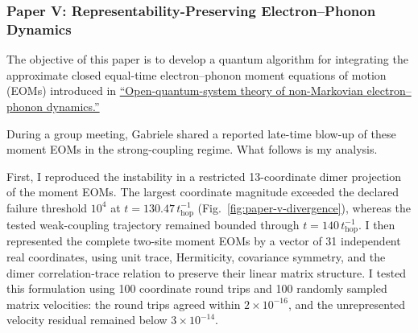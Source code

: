 \documentclass[11pt]{article}
\begin{document}
\clearpage
\subsubsection*{Paper V: Representability-Preserving Electron--Phonon Dynamics}
The objective of this paper is to develop a quantum algorithm for integrating the approximate closed equal-time electron--phonon moment equations of motion (EOMs) introduced in \href{https://arxiv.org/abs/2606.22233}{``Open-quantum-system theory of non-Markovian electron--phonon dynamics.''}

During a group meeting, Gabriele shared a reported late-time blow-up of these moment EOMs in the strong-coupling regime. What follows is my analysis.

First, I reproduced the instability in a restricted 13-coordinate dimer projection of the moment EOMs. The largest coordinate magnitude exceeded the declared failure threshold \(10^4\) at \(t=130.47\,t_{\mathrm{hop}}^{-1}\) (Fig.~\ref{fig:paper-v-divergence}), whereas the tested weak-coupling trajectory remained bounded through \(t=140\,t_{\mathrm{hop}}^{-1}\). I then represented the complete two-site moment EOMs by a vector of 31 independent real coordinates, using unit trace, Hermiticity, covariance symmetry, and the dimer correlation-trace relation to preserve their linear matrix structure. I tested this formulation using 100 coordinate round trips and 100 randomly sampled matrix velocities: the round trips agreed within \(2\times10^{-16}\), and the unrepresented velocity residual remained below \(3\times10^{-14}\).
\end{document}
